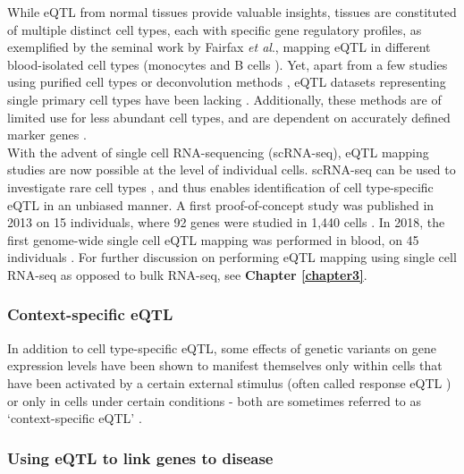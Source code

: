 While eQTL from normal tissues provide valuable insights, tissues are constituted of multiple distinct cell types, each with specific gene regulatory profiles, as exemplified by the seminal work by Fairfax \textit{et al}., mapping eQTL in different blood-isolated cell types (monocytes and B cells \cite{fairfax2012genetics}).
Yet, apart from a few studies using purified cell types \cite{fairfax2012genetics, kasela2017pathogenic, naranbhai2015genomic} or deconvolution methods \cite{westra2015cell, venet2001separation}, eQTL datasets representing single primary cell types have been lacking \cite{zhang2018cell}.
Additionally, these methods are of limited use for less abundant cell types, and are dependent on accurately defined marker genes \cite{zhernakova2017identification}. \\
 
With the advent of single cell RNA-sequencing (scRNA-seq), eQTL mapping studies are now possible at the level of individual cells. 
scRNA-seq can be used to investigate rare cell types \cite{villani2017single}, and thus enables identification of cell type-specific eQTL in an unbiased manner. 
A first proof-of-concept study was published in 2013 on 15 individuals, where 92 genes were studied in 1,440 cells \cite{wills2013single}.
In 2018, the first genome-wide single cell eQTL mapping was performed in blood, on 45 individuals \cite{van2018single}.
For further discussion on performing eQTL mapping using single cell RNA-seq as opposed to bulk RNA-seq, see \textbf{Chapter \ref{chapter3}}.

\subsubsection{Context-specific eQTL}

In addition to cell type-specific eQTL, some effects of genetic variants on gene expression levels have been shown to manifest themselves only within cells that have been activated by a certain external stimulus (often called response eQTL \cite{fairfax2014innate, barreiro2012deciphering, kim2017genetic}) or only in cells under certain conditions \cite{yao2014sex} - both are sometimes referred to as `context-specific eQTL' \cite{westra2014genome}. 

\newpage

\subsubsection{Using eQTL to link genes to disease}
\label{sec:eqtl_gwas}

